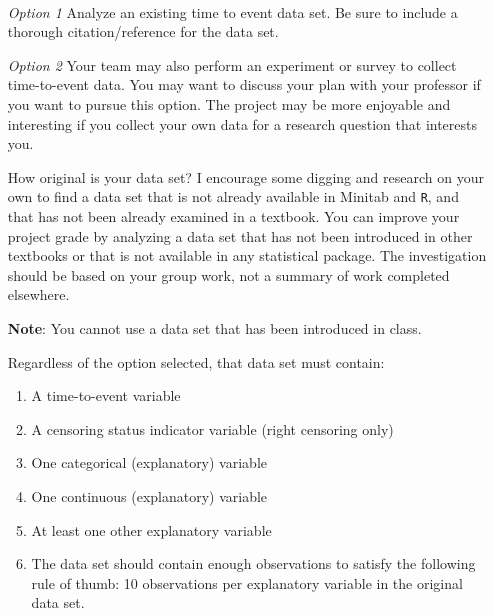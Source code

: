 \documentclass[letterpaper,12pt]{report}
\begin{document}
\\
\vskip5pt
\begin{minipage}{0.05\textwidth} \hspace{0.05in} \end{minipage}
\begin{minipage}{0.05\textwidth} \hspace{0.05in} \end{minipage}
\begin{minipage}{0.90\textwidth}
\begin{itemize}
    \item[\emph{Option 1}] Analyze an existing time to event data set.  Be sure to include a thorough citation/reference for the data set.
    \item[\emph{Option 2}] Your team may also perform an experiment or survey to collect time-to-event data.  You may want to discuss your plan with your professor if you want to pursue this option.  The project may be more enjoyable and interesting if you collect your own data for a research question that interests you.
     \item[]
\end{itemize}
\end{minipage}
\begin{itemize}
   \item[] How original is your data set?  I encourage some digging and research on your own to find a data set that is not already available in Minitab and \texttt{R}, and that has not been already examined in a textbook. You can improve your project grade by analyzing a data set that has not been introduced in other textbooks or that is not available in any statistical package. The investigation should be based on your group work, not a summary of work completed elsewhere.
    \item[] \textbf{Note}: You cannot use a data set that has been introduced in class.
    \item[]
\end{itemize}

\begin{itemize}
\item[] Regardless of the option selected, that data set must contain:
\begin{enumerate}
\item A time-to-event variable
\item A censoring status indicator variable (right censoring only)
\item One categorical (explanatory) variable
\item One continuous (explanatory) variable
\item At least one other explanatory variable
\item The data set should contain enough observations to satisfy the following rule of thumb: 10 observations per explanatory variable in the original data set.
\end{enumerate}
\item[]
\end{itemize}
\end{document}
